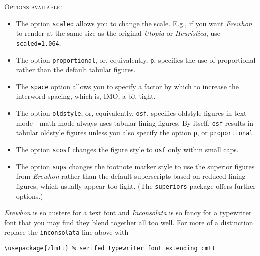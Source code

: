 \documentclass[11pt]{amsart}
\begin{document}
\textsc{Options available:}
\begin{itemize}
\item The option {\tt scaled} allows you to change the scale. E.g., if you want \emph{Erewhon} to render at the same size as the original \emph{Utopia} or \emph{Heuristica}, use {\tt scaled=1.064}.
\item
The option {\tt proportional}, or, equivalently, {\tt p}, specifies the use of proportional rather than the default tabular figures.
\item
 The {\tt space} option allows you to specify a factor by which to increase the interword spacing, which is, IMO, a bit tight.
\item
The option {\tt oldstyle}, or, equivalently, {\tt osf}, specifies oldstyle figures in text mode---math mode always uses tabular lining figures. By itself, {\tt osf} results in tabular oldstyle figures unless you also specify the option {\tt p}, or {\tt proportional}.
\item The option {\tt scosf} changes the figure style to {\tt osf} only within small caps. 
\item
 The option {\tt sups}  changes the footnote marker style to use the superior figures from \emph{Erewhon} rather than the default  superscripts based on reduced lining figures, which usually appear too light. (The {\tt superiors} package offers further options.)
\end{itemize}

\emph{Erewhon} is so austere for a text font and \emph{Inconsolata} is so fancy for a typewriter font that you may find they blend together all too well. For more of a distinction replace the {\tt inconsolata} line above with
\begin{verbatim}
\usepackage{zlmtt} % serifed typewriter font extending cmtt
\end{verbatim}
\end{document}
